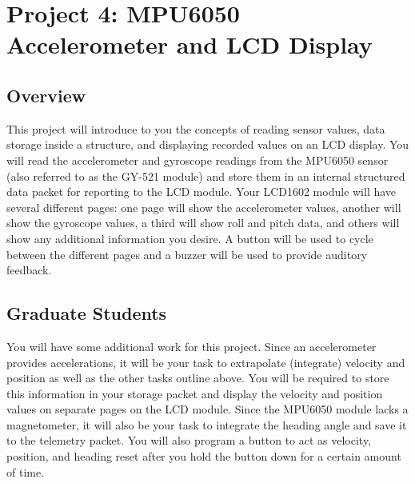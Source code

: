 %

\chapter{Project 4: MPU6050 Accelerometer and LCD Display}

\section*{Overview} 
This project will introduce to you the concepts of reading sensor values, data storage inside a structure, and displaying recorded values on an LCD display. 
You will read the accelerometer and gyroscope readings from the MPU6050 sensor (also referred to as the GY-521 module) and store them in an internal structured data packet for reporting to the LCD module.
Your LCD1602 module will have several different pages: one page will show the accelerometer values, another will show the gyroscope values, a third will show roll and pitch data, and others will show any additional information you desire.
A button will be used to cycle between the different pages and a buzzer will be used to provide auditory feedback.

\section*{Graduate Students} 
You will have some additional work for this project. 
Since an accelerometer provides accelerations, it will be your task to extrapolate (integrate) velocity and position as well as the other tasks outline above.
You will be required to store this information in your storage packet and display the velocity and position values on separate pages on the LCD module.
Since the MPU6050 module lacks a magnetometer, it will also be your task to integrate the heading angle and save it to the telemetry packet.
You will also program a button to act as velocity, position, and heading reset after you hold the button down for a certain amount of time.

